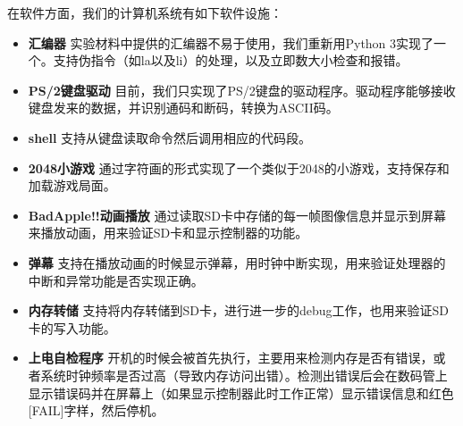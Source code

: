 \documentclass[11pt,utf8]{report}
\begin{document}
在软件方面，我们的计算机系统有如下软件设施：
\begin{itemize}
\item \textbf{汇编器} 实验材料中提供的汇编器不易于使用，我们重新用Python 3实现了一个。支持伪指令（如la以及li）的处理，以及立即数大小检查和报错。
\item \textbf{PS/2键盘驱动} 目前，我们只实现了PS/2键盘的驱动程序。驱动程序能够接收键盘发来的数据，并识别通码和断码，转换为ASCII码。
\item \textbf{shell} 支持从键盘读取命令然后调用相应的代码段。
\item \textbf{2048小游戏} 通过字符画的形式实现了一个类似于2048的小游戏，支持保存和加载游戏局面。
\item \textbf{BadApple!!动画播放} 通过读取SD卡中存储的每一帧图像信息并显示到屏幕来播放动画，用来验证SD卡和显示控制器的功能。
\item \textbf{弹幕} 支持在播放动画的时候显示弹幕，用时钟中断实现，用来验证处理器的中断和异常功能是否实现正确。
\item \textbf{内存转储} 支持将内存转储到SD卡，进行进一步的debug工作，也用来验证SD卡的写入功能。
\item \textbf{上电自检程序} 开机的时候会被首先执行，主要用来检测内存是否有错误，或者系统时钟频率是否过高（导致内存访问出错）。检测出错误后会在数码管上显示错误码并在屏幕上（如果显示控制器此时工作正常）显示错误信息和红色[FAIL]字样，然后停机。
\end{itemize}
\end{document}
